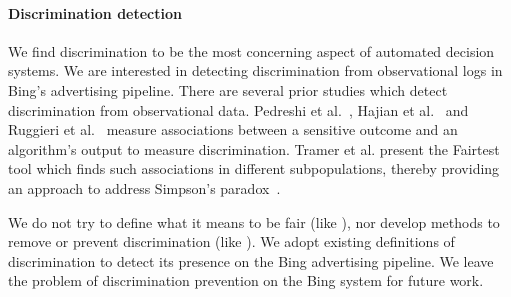 \documentclass[10pt, onecolumn]{report}
\begin{document}



\paragraph{Discrimination detection}
We find discrimination to be the most concerning aspect of automated decision systems. 
We are interested in detecting discrimination from observational logs in Bing's 
advertising pipeline. There are several prior studies which detect discrimination 
from observational data. Pedreshi et al.~\cite{pedreshi08discrimination}, 
Hajian et al.~\cite{hajian13methodology} and Ruggieri et al.~\cite{ruggieri10data}
measure associations between a sensitive outcome and an algorithm's output
to measure discrimination. 
Tramer et al. present the Fairtest tool which finds such associations in 
different subpopulations, thereby providing an approach to address 
Simpson's paradox~\cite{tramer15fairtest}. 

We do not try to define what it means to be fair (like \cite{dwork2012fairness}), 
nor develop methods to remove or prevent discrimination (like \cite{zemel13learning}). 
We adopt existing definitions of discrimination to detect its presence on the Bing
advertising pipeline. We leave the problem of discrimination prevention on the 
Bing system for future work.
\end{document}
